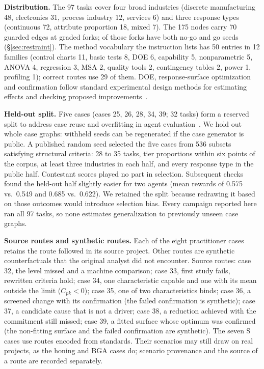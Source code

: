 \documentclass{article}
\begin{document}
\textbf{Distribution.} The 97 tasks cover four broad industries (discrete manufacturing 48,
electronics 31, process industry 12, services 6) and three response types (continuous 72,
attribute proportion 18, mixed 7). The 175 nodes carry 70 guarded edges at \nForks{} graded
forks; \nMatched{} of those forks have both no-go and go seeds (\S\ref{sec:restraint}).
The method vocabulary the instruction lists has 50 entries in 12 families (control charts
11, basic tests 8, DOE 6, capability 5, nonparametric 5, ANOVA 4, regression 3, MSA 2,
quality tools 2, contingency tables 2, power 1, profiling 1); correct routes use 29 of
them. DOE, response-surface optimization and confirmation follow standard experimental design methods for estimating effects and checking proposed improvements~\citep{montgomery2013daoe}.

\textbf{Held-out split.} Five cases (cases 25, 26, 28, 34, 39; 32 tasks) form a reserved split to address case reuse and overfitting in agent evaluation~\citep{kapoor2024agentsmatter}. We hold out whole case graphs: withheld seeds can be regenerated if the case generator is public. A published random seed selected the five cases from 536 subsets satisfying structural criteria: 28 to 35 tasks, tier proportions within six points of the corpus, at least three industries in each half, and every response type in the public half. Contestant scores played no part in selection. Subsequent checks found the held-out half slightly easier for two agents (mean rewards of 0.575 vs.\ 0.549 and 0.685 vs.\ 0.622). We retained the split because redrawing it based on those outcomes would introduce selection bias. Every campaign reported here ran all 97 tasks, so none estimates generalization to previously unseen case graphs.

\textbf{Source routes and synthetic routes.} Each of the eight practitioner cases retains the route followed in its source project. Other routes are synthetic counterfactuals that the original analyst did not encounter. Source routes: case 32, the level
missed and a machine comparison; case 33, first study fails, rewritten criteria hold; case
34, one characteristic capable and one with its mean outside the limit ($C_{pk}<0$); case
35, one of two characteristics binds; case 36, a screened change with its confirmation (the
failed confirmation is synthetic); case 37, a candidate cause that is not a driver; case 38,
a reduction achieved with the commitment still missed; case 39, a fitted surface whose
optimum was confirmed (the non-fitting surface and the failed confirmation are synthetic).
The seven S cases use routes encoded from standards. Their scenarios may still draw on real projects, as the honing and BGA cases do; scenario provenance and the source of a route are recorded separately.
\end{document}
